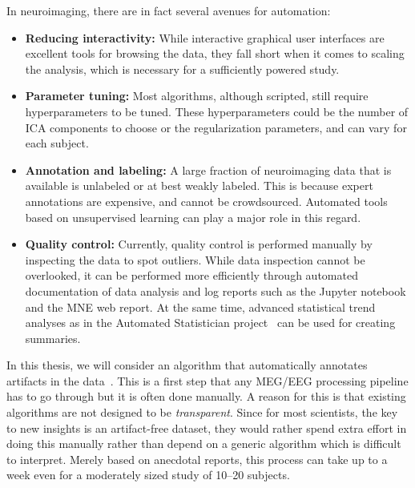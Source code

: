 In neuroimaging, there are in fact several avenues for automation:
\begin{itemize}[noitemsep,nolistsep,nosep]
\item \textbf{Reducing interactivity:} While interactive graphical user interfaces are excellent tools for browsing the data, they fall short when it comes to scaling the analysis, which is necessary for a sufficiently powered study. 

\item \textbf{Parameter tuning:} Most algorithms, although scripted, still require hyperparameters to be tuned. These hyperparameters could be the number of ICA components to choose or the regularization parameters, and can vary for each subject.
\item \textbf{Annotation and labeling:} A large fraction of neuroimaging data that is available is unlabeled or at best weakly labeled. This is because expert annotations are expensive, and cannot be crowdsourced. Automated tools based on unsupervised learning can play a major role in this regard.
\item \textbf{Quality control:} Currently, quality control is performed manually by inspecting the data to spot outliers. While data inspection cannot be overlooked, it can be performed more efficiently through automated documentation of data analysis and log reports such as the Jupyter notebook and the MNE web report. At the same time, advanced statistical trend analyses as in the Automated Statistician project~\citep{duvenaud2013structure} can be used for creating summaries.
\end{itemize}
In this thesis, we will consider an algorithm that automatically annotates artifacts in the data~\citep{jas2016automated, jas2017autoreject}. This is a first step that any \ac{MEG}/\ac{EEG} processing pipeline has to go through but it is often done manually. A reason for this is that existing algorithms are not designed to be \emph{transparent}. Since for most scientists, the key to new insights is an artifact-free dataset, they would rather spend extra effort in doing this manually rather than depend on a generic algorithm which is difficult to interpret. %
Merely based on anecdotal reports, this process can take up to a week even for a moderately sized study of 10--20 subjects.

